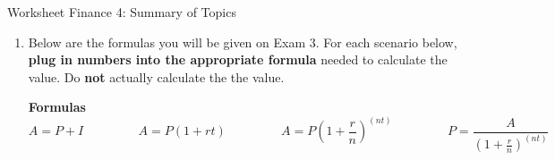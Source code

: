 \documentclass[12pt]{article}
\renewcommand{\emph}[1]{\textsf{\textbf{#1}}} %
\begin{document}
\begin{center}
{\Large  Worksheet Finance 4: Summary of Topics}
\end{center}

\begin{enumerate}
\item Below are the formulas you will be given on Exam 3. For each scenario below,  \emph{plug in numbers into the appropriate formula} needed to calculate the value. Do \emph{not} actually calculate the the value.

\begin{center}
\textbf{Formulas}
$$ A=P+I \quad \hspace{1cm} \quad A=P(1+rt) \quad \hspace{1cm} \quad A=P\left(1+\frac{r}{n}\right)^{(nt)} \quad \hspace{1cm} \quad P=\frac{A}{\left( 1+\frac{r}{n}\right)^{(nt)}} $$


\end{center}
\end{enumerate}
\end{document}

